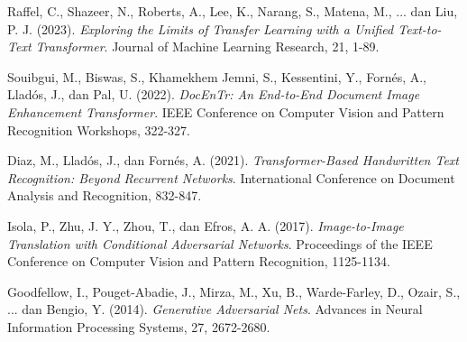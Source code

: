 \documentclass[12pt,a4paper]{article}
\begin{document}
\begin{thebibliography}{plain}
Raffel, C., Shazeer, N., Roberts, A., Lee, K., Narang, S., Matena, M., ... dan Liu, P. J. (2023).
\textit{Exploring the Limits of Transfer Learning with a Unified Text-to-Text Transformer}.
Journal of Machine Learning Research, 21, 1-89.

Souibgui, M., Biswas, S., Khamekhem Jemni, S., Kessentini, Y., Fornés, A., Lladós, J., dan Pal, U. (2022).
\textit{DocEnTr: An End-to-End Document Image Enhancement Transformer}.
IEEE Conference on Computer Vision and Pattern Recognition Workshops, 322-327.

Diaz, M., Lladós, J., dan Fornés, A. (2021).
\textit{Transformer-Based Handwritten Text Recognition: Beyond Recurrent Networks}.
International Conference on Document Analysis and Recognition, 832-847.

Isola, P., Zhu, J. Y., Zhou, T., dan Efros, A. A. (2017).
\textit{Image-to-Image Translation with Conditional Adversarial Networks}.
Proceedings of the IEEE Conference on Computer Vision and Pattern Recognition, 1125-1134.

Goodfellow, I., Pouget-Abadie, J., Mirza, M., Xu, B., Warde-Farley, D., Ozair, S., ... dan Bengio, Y. (2014).
\textit{Generative Adversarial Nets}.
Advances in Neural Information Processing Systems, 27, 2672-2680.

\end{thebibliography}
\end{document}
